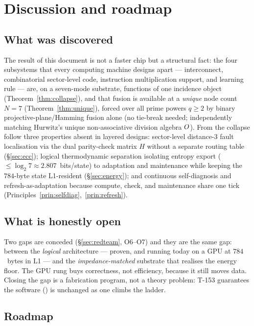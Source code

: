 \section{Discussion and roadmap}
\label{sec:discussion}

\subsection{What was discovered}

The result of this document is not a faster chip but a structural fact: the
four subsystems that every computing machine designs apart --- interconnect,
combinatorial sector-level code, instruction multiplication support, and
learning rule --- are, on a seven-mode substrate, functions of one incidence
object (Theorem~\ref{thm:collapse}), and that fusion is available at a
\emph{unique} node count $N=7$ (Theorem~\ref{thm:unique}), forced over all
prime powers $q\ge 2$ by binary projective-plane/Hamming fusion alone (no
tie-break needed; independently matching Hurwitz's unique non-associative
division algebra $O$). From the collapse follow three properties absent in
layered designs: sector-level distance-$3$ fault localisation via the dual
parity-check matrix $H$ without a separate routing table (\S\ref{sec:ecc});
logical thermodynamic separation isolating entropy export ($\le\log_2 7\approx
2.807$~bits/state) to adaptation and maintenance while keeping the $784$-byte
state L1-resident (\S\ref{sec:energy}); and continuous self-diagnosis and
refresh-as-adaptation because compute, check, and maintenance share one tick
(Principles~\ref{prin:selfdiag},~\ref{prin:refresh}).

\subsection{What is honestly open}

Two gaps are conceded (\S\ref{sec:redteam}, O6--O7) and they are the same
gap: between the \emph{logical} architecture --- proven, and running today on
a GPU at $784$~bytes in L1 --- and the \emph{impedance-matched} substrate
that realises the energy floor. The GPU rung buys correctness, not
efficiency, because it still moves data. Closing the gap is a fabrication
program, not a theory problem: T-153 guarantees the software (\SYNARC{}) is
unchanged as one climbs the ladder.

\subsection{Roadmap}


